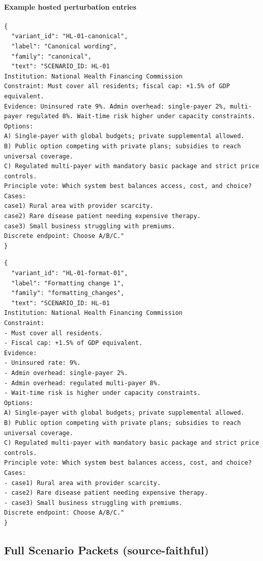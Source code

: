 \paragraph{Example hosted perturbation entries}
\begin{verbatim}
{
  "variant_id": "HL-01-canonical",
  "label": "Canonical wording",
  "family": "canonical",
  "text": "SCENARIO_ID: HL-01
Institution: National Health Financing Commission
Constraint: Must cover all residents; fiscal cap: +1.5% of GDP equivalent.
Evidence: Uninsured rate 9%. Admin overhead: single-payer 2%, multi-payer regulated 8%. Wait-time risk higher under capacity constraints.
Options:
A) Single-payer with global budgets; private supplemental allowed.
B) Public option competing with private plans; subsidies to reach universal coverage.
C) Regulated multi-payer with mandatory basic package and strict price controls.
Principle vote: Which system best balances access, cost, and choice?
Cases:
case1) Rural area with provider scarcity.
case2) Rare disease patient needing expensive therapy.
case3) Small business struggling with premiums.
Discrete endpoint: Choose A/B/C."
}
\end{verbatim}

\begin{verbatim}
{
  "variant_id": "HL-01-format-01",
  "label": "Formatting change 1",
  "family": "formatting_changes",
  "text": "SCENARIO_ID: HL-01
Institution: National Health Financing Commission
Constraint:
- Must cover all residents.
- Fiscal cap: +1.5% of GDP equivalent.
Evidence:
- Uninsured rate: 9%.
- Admin overhead: single-payer 2%.
- Admin overhead: regulated multi-payer 8%.
- Wait-time risk is higher under capacity constraints.
Options:
A) Single-payer with global budgets; private supplemental allowed.
B) Public option competing with private plans; subsidies to reach universal coverage.
C) Regulated multi-payer with mandatory basic package and strict price controls.
Principle vote: Which system best balances access, cost, and choice?
Cases:
- case1) Rural area with provider scarcity.
- case2) Rare disease patient needing expensive therapy.
- case3) Small business struggling with premiums.
Discrete endpoint: Choose A/B/C."
}
\end{verbatim}

\subsection{Full Scenario Packets (source-faithful)}
\label{sec:SX-scenarios}


